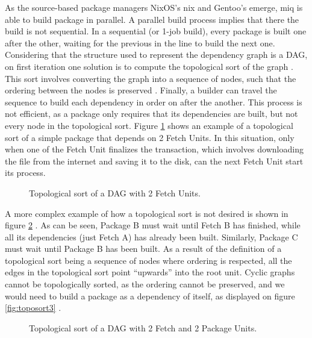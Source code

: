As the source-based package managers NixOS's nix and
Gentoo's emerge, miq is able to build package in parallel. A
parallel build process implies that there the build is not
sequential. In a sequential (or 1-job build), every package
is built one after the other, waiting for the previous in
the line to build the next one. Considering that the
structure used to represent the dependency graph is a
\acl{DAG}, on first iteration one solution is to compute the
topological sort of the graph
 . This sort
involves converting the graph into a sequence of nodes, such
that the ordering between the nodes is preserved
\cite{erParallelComputationApproach1983} . Finally, a
builder can travel the sequence to build each dependency in
order on after the another.
This process is not efficient, as a package only requires
that its dependencies are built, but not every node in the
topological sort. Figure \ref{fig:toposort} shows an example
of a topological sort of a simple package that depends on 2
Fetch Units. In this situation, only when one of the Fetch
Unit finalizes the transaction, which involves downloading
the file from the internet and saving it to the disk, can
the next Fetch Unit start its process.

\begin{figure}[hbtp]
    \centerfloat
    
    \caption{Topological sort of a \ac{DAG} with 2 Fetch Units.}
    \label{fig:toposort}
\end{figure}

A more complex example of how a topological sort is not
desired is shown in figure \ref{fig:toposort2} . As can be
seen, Package B must wait until Fetch B has finished, while
all its dependencies (just Fetch A) has already been built.
Similarly, Package C must wait until Package B has been
built. As a result of the definition of a topological sort
being a sequence of nodes where ordering is respected, all
the edges in the topological sort point ``upwards'' into the
root unit. Cyclic graphs cannot be topologically sorted, as
the ordering cannot be preserved, and we would need to build
a package as a dependency of itself, as displayed on figure
\ref{fig:toposort3} .

\begin{figure}[hbtp]
    \centerfloat
    
    \caption{Topological sort of a \ac{DAG} with 2 Fetch and
    2 Package Units.}
    \label{fig:toposort2}
\end{figure}

